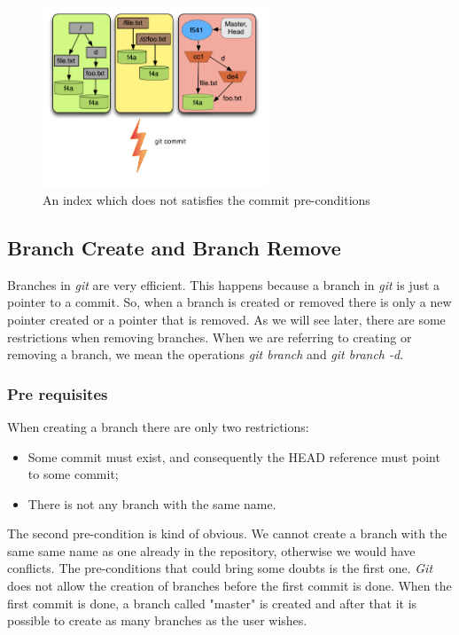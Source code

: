 \begin{figure}[tp]
   \centering
   \includegraphics[width=0.6\textwidth]{images/commit_pre.png}
   \caption{An index which does not satisfies the commit
   pre-conditions}\label{fig:commit_pre}
\end{figure}

\subsection{Branch Create and Branch Remove}
Branches in \emph{git} are very efficient. This happens because a
branch in \emph{git} is just a pointer to a commit. So, when a branch
is created or removed there is only a new pointer created or a
pointer that is removed. As we will see later, there are some
restrictions when removing branches. When we are referring to
creating or removing a branch, we mean the operations
\emph{git branch} and \emph{git branch -d}.

\subsubsection{Pre requisites}
When creating a branch there are only two restrictions:
\begin{itemize}
   \item Some commit must exist, and consequently the HEAD reference must point
   to some commit;
   \item There is not any branch with the same name.
\end{itemize}
The second pre-condition is kind of obvious. We cannot create a branch
with the same same name as one already in the repository, otherwise we
would have conflicts. The pre-conditions that could bring some doubts
is the first one. \emph{Git} does not allow the creation of branches
before the first commit is done. When the first commit is done, a
branch called "master" is created and after that it is possible to
create as many branches as the user wishes.\\

